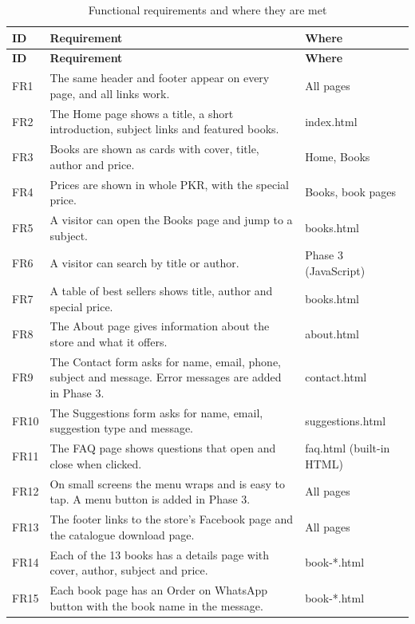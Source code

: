 \documentclass[12pt,a4paper]{article}
\begin{document}
{\small\singlespacing
\begin{longtable}{|p{1.1cm}|p{9.8cm}|p{2.9cm}|}
\caption{Functional requirements and where they are met}\label{tab:fr}\\
\hline
\rowcolor{black!10}\textbf{ID} & \textbf{Requirement} & \textbf{Where}\\
\hline
\endfirsthead
\hline
\rowcolor{black!10}\textbf{ID} & \textbf{Requirement} & \textbf{Where}\\
\hline
\endhead
FR1 & The same header and footer appear on every page, and all links work. & All pages\\
\hline
FR2 & The Home page shows a title, a short introduction, subject links and featured books. & index.html\\
\hline
FR3 & Books are shown as cards with cover, title, author and price. & Home, Books\\
\hline
FR4 & Prices are shown in whole PKR, with the special price. & Books, book pages\\
\hline
FR5 & A visitor can open the Books page and jump to a subject. & books.html\\
\hline
FR6 & A visitor can search by title or author. & Phase 3 (JavaScript)\\
\hline
FR7 & A table of best sellers shows title, author and special price. & books.html\\
\hline
FR8 & The About page gives information about the store and what it offers. & about.html\\
\hline
FR9 & The Contact form asks for name, email, phone, subject and message. Error messages are added in Phase 3. & contact.html\\
\hline
FR10 & The Suggestions form asks for name, email, suggestion type and message. & suggestions.html\\
\hline
FR11 & The FAQ page shows questions that open and close when clicked. & faq.html (built-in HTML)\\
\hline
FR12 & On small screens the menu wraps and is easy to tap. A menu button is added in Phase 3. & All pages\\
\hline
FR13 & The footer links to the store's Facebook page and the catalogue download page. & All pages\\
\hline
FR14 & Each of the 13 books has a details page with cover, author, subject and price. & book-*.html\\
\hline
FR15 & Each book page has an Order on WhatsApp button with the book name in the message. & book-*.html\\
\hline
\end{longtable}}
\end{document}
